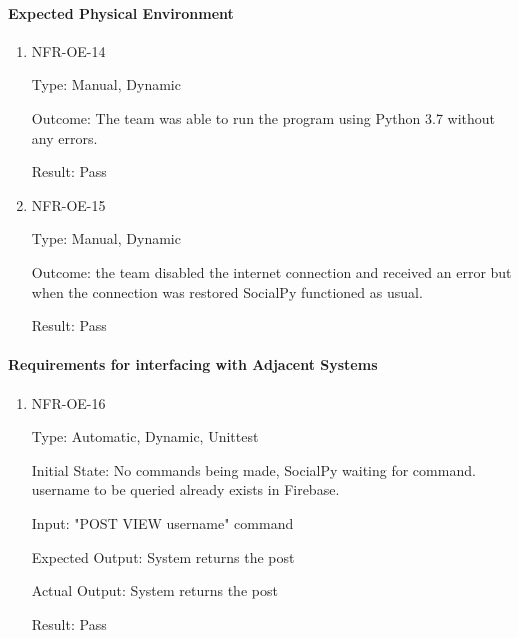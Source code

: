 \documentclass[12pt, titlepage]{article}
\begin{document}
\paragraph{Expected Physical Environment}
\begin{enumerate}
    \item{NFR-OE-14\\}
    
    Type: Manual, Dynamic
    
    Outcome: The team was able to run the program using Python 3.7 without any errors.
    
    Result: Pass
    
    \item{NFR-OE-15\\}
    
    Type: Manual, Dynamic
    
    Outcome: the team disabled the internet connection and received an error but when the connection was restored SocialPy functioned as usual.
    					
    Result: Pass
    

 \end{enumerate} 
 
 \paragraph{Requirements for interfacing with Adjacent Systems}
\begin{enumerate}
    \item{NFR-OE-16\\}
    
    Type: Automatic, Dynamic, Unittest
    
    Initial State: No commands being made, SocialPy waiting for command. username to be queried already exists in Firebase.
    
    Input: "POST VIEW username" command
    
    Expected Output: System returns the post
    
    Actual Output: System returns the post
    					
    Result: Pass
    

 \end{enumerate} 
 
\end{document}
